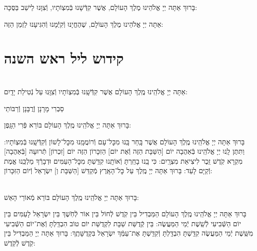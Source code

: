 \documentclass[twoside, openany, parskip=half, 11pt]{book}
\begin{document}
\vspace{-.5\baselineskip}
בָּרוּךְ אַתָּה יְיָ אֱלֹהֵינוּ מֶלֶךְ הָעוֹלָם, אֲשֶׁר קִדְּֿשָׁנוּ בְּֿמִצְוֹתָיו, וְֿצִוָּנוּ לֵישֵׁב בַּסֻּכָּה:

אַתָּה יְיָ אֱלֹהֵינוּ מֶלֶךְ הָעוֹלָם, שֶׁהֶחֱיָנוּ וְֿקִיְּֿֿמָנוּ וְֿהִגִּיעָנוּ לַזְמַן הַזֶּה:


\vspace{\baselineskip}
{\let\clearpage\relax
\chapter[קידוש ליל ראש השנה]{ קידוש ליל ראש השנה }}

\\
אַתָּה יְיָ אֱלֹהֵֽינוּ מֶֽלֶךְ הָעוֹלָם אֲשֶׁר קִדְּֿשָֽׁנוּ בְּֿמִצְוֹתָיו וְֿצִוָּֽנוּ עַל נְֿטִילַת יָדָֽיִם:

\begin{footnotesize}
סַבְרִי מָרָנָן וְֿרֲבָּנָן וְֿרַבּוֹתַי\\
\end{footnotesize}
בָּרוּךְ אַתָּה יְיָ אֱלֹהֵֽינוּ מֶֽלֶךְ הָעוֹלָם בּוֹרֵא פְּֿרִי הַגָּֽפֶן:

בָּרוּךְ אַתָּה יְיָ אֱלֹהֵֽינוּ מֶֽלֶךְ הָעוֹלָם אֲשֶׁר בָּֽחַר בָּֽנוּ מִכׇּל־עָם וְֿרוֹמֲמָֽנוּ מִכׇּל־לָשׁוֹן וְֿקִדְּֿשָֽׁנוּ בְּֿמִצְוֹתָיו: וַתִּתֶּן לָֽנוּ יְיָ אֱלֹהֵֽינוּ בְּֿאַהֲבָה יוֹם [הַשַּׁבָּת הַזֶּה וְֿאֶת יוֹם] הַזִכָּרוֹן הַזֶּה יוֹם [זִכְרוֹן] תְּֿרוּעָה [בְּֿאַהֲבָה] מִקְרָא קֹֽדֶשׁ זֵֽכֶר לִיצִיאַת מִצְרָֽיִם: כִּי בָֽנוּ בָחַֽרְתָּ וְֿאוֹתָֽנוּ קִדַּֽשְׁתָּ מִכׇּל־הָעַמִּים וּדְבָרְֿךָ מַלְכֵּֽנוּ אֱמֶת וְֿקַיָּם לָעַד: בָּרוּךְ אַתָּה יְיָ מֶֽלֶךְ עַל כׇּל־הָאָֽרֶץ מְֿקַדֵּשׁ [הַשַּׁבָּת וְ] יִשְׂרָאֵל וְֿיוֹם הַזִּכָּרוֹן:



\begin{sometimes}

\\
בָּרוּךְ אַתָּה יְיָ אֱלֹהֵֽינוּ מֶֽלֶךְ הָעוֹלָם בּוֹרֵא מְֿאוֹרֵי הָאֵשׁ:

בָּרוּךְ אַתָּה יְיָ אֱלֹהֵֽינוּ מֶֽלֶךְ הָעוֹלָם הַמַּבְדִיל בֵּין קֹֽדֶשׁ לְֿחוֹל בֵּין אוֹר לְֿחֹֽשֶׁךְ בֵּין יִשְׂרָאֵל לָעַמִּים בֵּין יוֹם הַשְּֿׁבִיעִי לְֿשֵֽׁשֶׁת יְֿמֵי הַמַּעֲשֶׂה: בֵּין קְֿדֻשַּׁת שַׁבָּת לִקְדֻשַּׁת יוֹם טוֹב הִבְדַּֽלְתָּ וְֿאֶת־יוֹם הַשְּֿׁבִיעִי מִשֵּֽׁשֶׁת יְֿמֵי הַמַּעֲשֶׂה קִדַּֽשְׁתָּ הִבְדַּֽלְתָּ וְֿקִדַּֽשְׁתָּ אֶת־עַמְּֿךָ יִשְׂרָאֵל בִּקְדֻשָּׁתֶֽךָ: בָּרוּךְ אַתָּה יְיָ הַמַּבְדִּיל בֵּין קֹֽדֶשׁ לְֿקֹֽדֶשׁ:

\end{sometimes}
\end{document}
